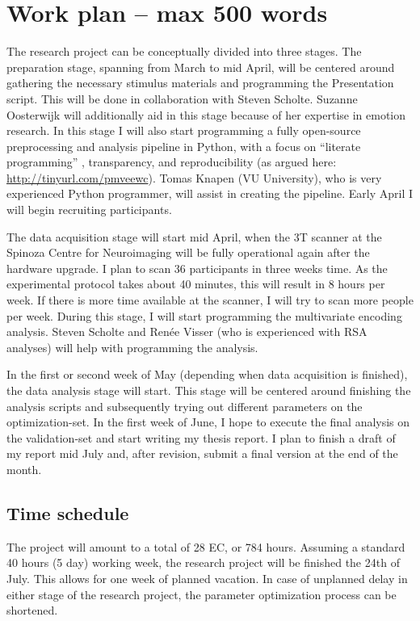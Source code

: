\documentclass[12pt,a4paper]{article}\usepackage[]{graphicx}\usepackage[]{color}
\begin{document}
\section{Work plan \textmd{– max 500 words}}
The research project can be conceptually divided into three stages. The preparation stage, spanning from March to mid April, will be centered around gathering the necessary stimulus materials and programming the Presentation script. This will be done in collaboration with Steven Scholte. Suzanne Oosterwijk will additionally aid in this stage because of her expertise in emotion research. In this stage I will also start programming a fully open-source preprocessing and analysis pipeline in Python, with a focus on ``literate programming'' \citep{knuth1984}, transparency, and reproducibility (as argued here: \url{http://tinyurl.com/pmveewc}). Tomas Knapen (VU University), who is very experienced Python programmer, will assist in creating the pipeline. Early April I will begin recruiting participants. 

The data acquisition stage will start mid April, when the 3T scanner at the Spinoza Centre for Neuroimaging will be fully operational again after the hardware upgrade. I plan to scan 36 participants in three weeks time. As the experimental protocol takes about 40 minutes, this will result in 8 hours per week. If there is more time available at the scanner, I will try to scan more people per week. During this stage, I will start programming the multivariate encoding analysis. Steven Scholte and Renée Visser (who is experienced with RSA analyses) will help with programming the analysis.

In the first or second week of May (depending when data acquisition is finished), the data analysis stage will start. This stage will be centered around finishing the analysis scripts and subsequently trying out different parameters on the optimization-set. In the first week of June, I hope to execute the final analysis on the validation-set and start writing my thesis report. I plan to finish a draft of my report mid July and, after revision, submit a final version at the end of the month.

\subsection{Time schedule}
The project will amount to a total of 28 EC, or  784 hours. Assuming a standard 40 hours (5 day) working week, the research project will be finished the 24th of July. This allows for one week of planned vacation. In case of unplanned delay in either stage of the research project, the parameter optimization process can be shortened. 
\end{document}
